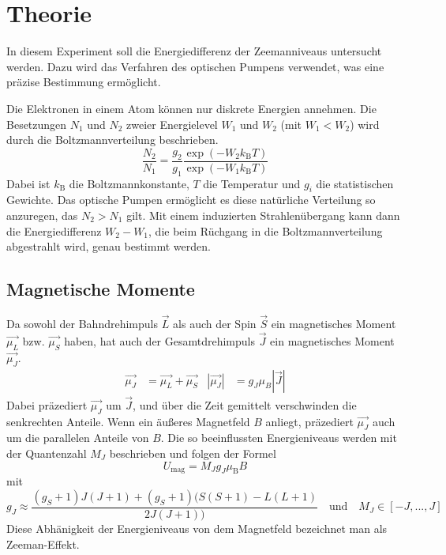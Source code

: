 \section{Theorie}
\label{sec:Theorie}
In diesem Experiment soll die Energiedifferenz der Zeemanniveaus untersucht werden. Dazu wird das Verfahren des optischen Pumpens verwendet, was eine präzise Bestimmung ermöglicht.

Die Elektronen in einem Atom können nur diskrete Energien annehmen. Die Besetzungen $N_1$ und $N_2$  zweier Energielevel $W_1$ und $W_2$ (mit $W_1<W_2$) wird durch die Boltzmannverteilung beschrieben.
\begin{equation}
	\frac{N_2}{N_1}=\frac{g_2}{g_1}\frac{\exp(-W_2k_\text{B}T)}{\exp(-W_1k_\text{B}T)}
	\label{eqn:Boltzmann}
\end{equation}
Dabei ist $k_\text{B}$ die Boltzmannkonstante, $T$ die Temperatur und $g_i$ die statistischen Gewichte. Das optische Pumpen ermöglicht es diese natürliche Verteilung so anzuregen, das $N_2 > N_1$ gilt. Mit einem induzierten Strahlenübergang kann dann die Energiedifferenz $W_2-W_1$, die beim Rüchgang in die Boltzmannverteilung abgestrahlt wird, genau bestimmt werden.
\subsection{Magnetische Momente}
Da sowohl der Bahndrehimpuls $\vec{L}$ als auch der Spin $\vec{S}$ ein magnetisches Moment $\vec{\mu_L}$ bzw. $\vec{\mu_S}$ haben, hat auch der Gesamtdrehimpuls  $\vec{J}$ ein magnetisches Moment $\vec{\mu_J}$.
\begin{align}
	\vec{\mu_J}&=\vec{\mu_L} +\vec{\mu_S} & \left| \vec{\mu_J} \right|&=g_J\mu_B\left| \vec{J} \right|
\end{align}
Dabei präzediert $\vec{\mu_J}$ um $\vec{J}$, und über die Zeit gemittelt verschwinden die senkrechten Anteile.
Wenn ein äußeres Magnetfeld $B$ anliegt, präzediert $\vec{\mu_J}$ auch um die parallelen Anteile von $B$. Die so beeinflussten Energieniveaus werden mit der Quantenzahl $M_J$ beschrieben und folgen der Formel
\begin{equation}
	U_\text{mag} = M_J g_J \mu_\text{B}B
\end{equation}
mit
\begin{equation}
	g_J\approx \frac{(g_S+1)J(J+1)+(g_S+1)(S(S+1)-L(L+1)}{2J(J+1))} \quad \text{und}\quad M_J \in [-J,...,J]
\end{equation}
Diese Abhänigkeit der Energieniveaus von dem Magnetfeld bezeichnet man als Zeeman-Effekt.
